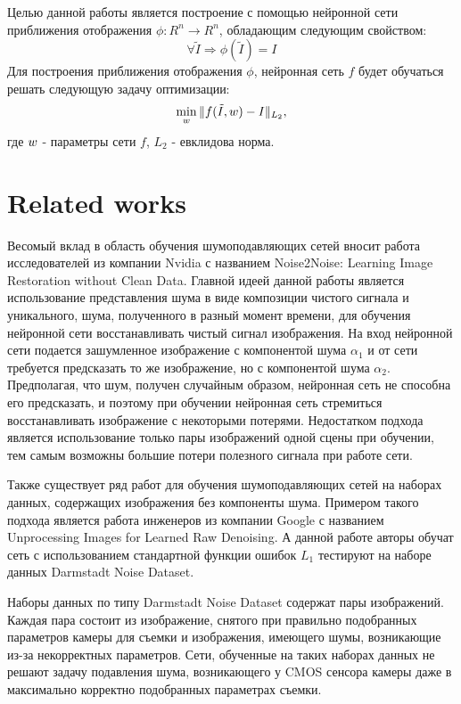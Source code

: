 \documentclass[runningheads]{llncs}
\begin{document}
Целью данной работы является построение с помощью нейронной сети приближения отображения $\phi: \mathit{R}^n \longrightarrow \mathit{R}^n$, обладающим следующим свойством:
\begin{equation}\label{eq:main_property}
\forall \tilde{I} \Longrightarrow \phi(\tilde{I}) = I 
\end{equation}
Для построения приближения отображения $\phi$, нейронная сеть $f$ будет обучаться решать следующую задачу оптимизации:
\begin{eqnarray}\label{eq:main_min_task}
\min_{\mathnormal{w}} \Arrowvert f(\tilde{I}, \mathnormal{w}) - I \Arrowvert_{L_2}\mathit{ ,}
\end{eqnarray}
где $\mathnormal{w}$ - параметры сети $f$, $L_2$ - евклидова норма.


\section{Related works}

Весомый вклад в область обучения шумоподавляющих сетей вносит работа исследователей из компании Nvidia с названием Noise2Noise: Learning Image Restoration without Clean Data. Главной идеей данной работы является использование представления шума в виде композиции чистого сигнала и уникального, шума, полученного в разный момент времени, для обучения нейронной сети восстанавливать чистый сигнал изображения. На вход нейронной сети подается зашумленное изображение с компонентой шума $\alpha_1$ и от сети требуется предсказать то же изображение, но с компонентой шума $\alpha_2$. Предполагая, что шум, получен случайным образом, нейронная сеть не способна его предсказать, и поэтому при обучении нейронная сеть стремиться восстанавливать изображение с некоторыми потерями. Недостатком подхода является использование только пары изображений одной сцены при обучении, тем самым возможны большие потери полезного сигнала при работе сети.

Также существует ряд работ для обучения шумоподавляющих сетей на наборах данных, содержащих изображения без компоненты шума. Примером такого подхода является работа инженеров из компании Google с названием Unprocessing Images for Learned Raw Denoising. А данной работе авторы обучат сеть с использованием стандартной функции ошибок $L_1$ тестируют на наборе данных Darmstadt Noise Dataset. 

Наборы данных по типу Darmstadt Noise Dataset содержат пары изображений. Каждая пара состоит из изображение, снятого при правильно подобранных параметров камеры для съемки и изображения, имеющего шумы, возникающие из-за некорректных параметров. Сети, обученные на таких наборах данных не решают задачу подавления шума, возникающего у CMOS сенсора камеры даже в максимально корректно подобранных параметрах съемки.
\end{document}
